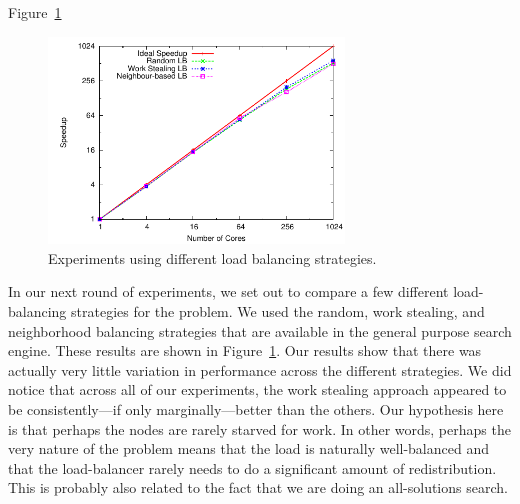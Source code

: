 \documentclass[11pt]{article}
\begin{document}
Figure~\ref{3schemes}
\begin{figure}
\centering
\includegraphics[width=0.7\textwidth]{plots/3schemes.pdf}
\caption{Experiments using different load balancing strategies.}
\label{3schemes}
\end{figure}

In our next round of experiments, we set out to compare a few different load-balancing strategies for the problem.  We
used the random, work stealing, and neighborhood balancing strategies that are available in the general purpose search
engine.  These results are shown in Figure~\ref{3schemes}.  Our results show that there was actually very little
variation in performance across the different strategies.  We did notice that across all of our experiments, the work
stealing approach appeared to be consistently---if only marginally---better than the others.  Our hypothesis here is
that perhaps the nodes are rarely starved for work.  In other words, perhaps the very nature of the problem means that
the load is naturally well-balanced and that the load-balancer rarely needs to do a significant amount of
redistribution.  This is probably also related to the fact that we are doing an all-solutions search. 
\end{document}
